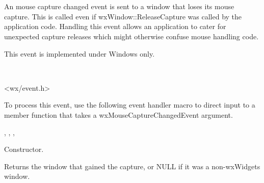 \section{}\label{wxmousecapturechangedevent}

An mouse capture changed event is sent to a window that loses its
mouse capture. This is called even if wxWindow::ReleaseCapture
was called by the application code. Handling this event allows
an application to cater for unexpected capture releases which
might otherwise confuse mouse handling code.

This event is implemented under Windows only.


\\


<wx/event.h>


To process this event, use the following event handler macro to direct input to a member
function that takes a wxMouseCaptureChangedEvent argument.

\twocolwidtha{7cm}
\begin{twocollist}\itemsep=0pt
\end{twocollist}


, 
, 
, 


\label{wxmousecapturechangedeventctor}


Constructor.

\label{wxmousecapturechangedeventgetcapturedwindow}


Returns the window that gained the capture, or NULL if it was a non-wxWidgets window.

